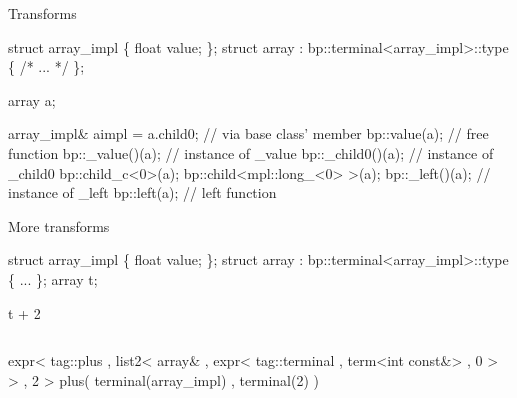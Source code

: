 \documentclass[9pt]{beamer}
\begin{document}
\begin{frame}[fragile]{Transforms}
\begin{semiverbatim}
struct array_impl \{ float value; \};
struct array : bp::terminal<array_impl>::type
\{ /* ... */ \};

array \alert<2>{a};

\alert<3>{array_impl& aimpl =}
\alert<4>{   a.child0;}          // via base class' member
\alert<5>{   bp::value(a);}      // free function
   \alert<8>{\alert<7>{\alert<6>{bp::_value}()}(a);}   // instance of _value
   \alert<9>{bp::_child0()(a);}  // instance of _child0
   \alert<10>{bp::child_c<0>(a);}
   \alert<11>{bp::child<mpl::long_<0> >(a);}
   \alert<12>{bp::_left()(a);}    // instance of _left
   \alert<13>{bp::left(a);}       // left function
\end{semiverbatim}
\end{frame}


\begin{frame}[fragile]{More transforms}
\begin{semiverbatim}
struct array_impl \{ float value; \};
struct array : bp::terminal<array_impl>::type \{ ... \};
array t;

\alert<4>{\alert<2>{t + 2}}
\begin{columns}[t]
  \alert<3>{expr<
  tag::plus 
, list2<
    array&
  , expr<
      tag::terminal 
    , term<int const&> 
    , 0
    > 
  >
, 2
>}
\alert<5>{plus(
    terminal(array_impl)
  , terminal(2)
)}
\end{columns}



\end{semiverbatim}
\note{ }
\end{frame}

\end{document}
